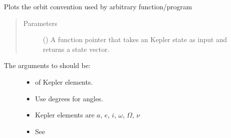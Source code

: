 \documentclass[letterpaper,10pt,english]{sphinxmanual}
\begin{document}

\begin{fulllineitems}
\label{\detokenize{modules/dpt_tools:dpt_tools.plot_orbit_convention}}
Plots the orbit convention used by arbitrary function/program
\begin{quote}\begin{description}
\item[{Parameters}] \leavevmode
{} () \textendash{} A function pointer that takes an Kepler state as input and returns a state vector.

\end{description}\end{quote}
\begin{description}
\item[{The arguments to  should be:}] \leavevmode\begin{itemize}
\item {} 
 of Kepler elements.

\item {} 
Use degrees for angles.

\item {} 
Kepler elements are \(a\), \(e\), \(i\), \(\omega\), \(\Omega\), \(\nu\)

\item {} 
See {\hyperref[\detokenize{modules/dpt_tools:dpt_tools.kep2cart}]{}}

\end{itemize}

\end{description}


%
\begin{sphinxVerbatim}[commandchars=\\\{\}]
   
   


\end{sphinxVerbatim}
\end{fulllineitems}
\end{document}
